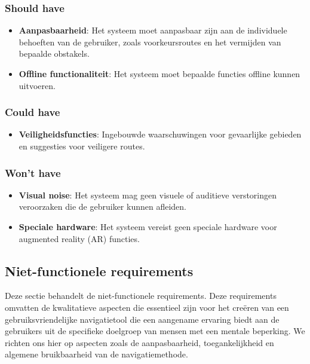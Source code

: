 \subsubsection{Should have}
\begin{itemize}
    \item \textbf{Aanpasbaarheid}: Het systeem moet aanpasbaar zijn aan de individuele behoeften van de gebruiker, zoals voorkeursroutes en het vermijden van bepaalde obstakels.
    \item \textbf{Offline functionaliteit}: Het systeem moet bepaalde functies offline kunnen uitvoeren.
\end{itemize}

\subsubsection{Could have}
\begin{itemize}
    \item \textbf{Veiligheidsfuncties}: Ingebouwde waarschuwingen voor gevaarlijke gebieden en suggesties voor veiligere routes.
\end{itemize}

\subsubsection{Won't have}
\begin{itemize}
    \item \textbf{Visual noise}: Het systeem mag geen visuele of auditieve verstoringen veroorzaken die de gebruiker kunnen afleiden.
    \item \textbf{Speciale hardware}: Het systeem vereist geen speciale hardware voor augmented reality (AR) functies.
\end{itemize}

\subsection{Niet-functionele requirements}
\label{sec:niet-functionele-requirements}

Deze sectie behandelt de niet-functionele requirements. Deze requirements omvatten de kwalitatieve aspecten die essentieel zijn voor het creëren van een gebruiksvriendelijke navigatietool die een aangename ervaring biedt aan de gebruikers uit de specifieke doelgroep van mensen met een mentale beperking. We richten ons hier op aspecten zoals de aanpasbaarheid, toegankelijkheid en algemene bruikbaarheid van de navigatiemethode.

